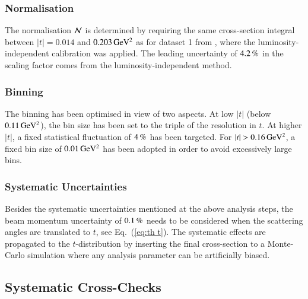 
\subsubsection{Normalisation}
\label{sec:normalisation}

The normalisation ${\cal N}$ is determined by requiring the same cross-section integral between $|t| = 0.014$ and $0.203\,{\rm GeV^2}$ as for dataset 1 from \cite{prl111}, where the luminosity-independent calibration was applied. The leading uncertainty of $4.2\,{\rm \%}$ in the scaling factor comes from the luminosity-independent method.



\subsubsection{Binning}
\label{sec:binning}

The binning has been optimised in view of two aspects. At low $|t|$ (below $0.11\,{\rm GeV^2}$), the bin size has been set to the triple of the resolution in $t$. At higher $|t|$, a fixed statistical fluctuation of $4\,{\rm \%}$ has been targeted. For $|t| > 0.16\,{\rm GeV^2}$, a fixed bin size of $0.01\,{\rm GeV^2}$ has been adopted in order to avoid excessively large bins.



\subsubsection{Systematic Uncertainties}
\label{sec:systematics}

Besides the systematic uncertainties mentioned at the above analysis steps, the beam momentum uncertainty of $0.1\,{\rm \%}$ needs to be considered when the scattering angles are translated to $t$, see Eq.~(\ref{eq:th t}). The systematic effects are propagated to the $t$-distribution by inserting the final cross-section to a Monte-Carlo simulation where any analysis parameter can be artificially biased. 



\subsection{Systematic Cross-Checks}
\label{sec:cross checks}

